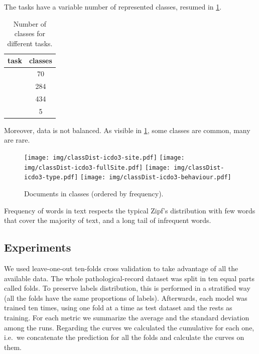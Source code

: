 The tasks have a variable number of represented classes, resumed in
\cref{fig:numClasses}.
\begin{table}
  \center
  \caption{Number of classes for different tasks.}
  \label{fig:numClasses}
  \begin{tabular}{|l|c|}
    \hline
    task & classes \\
    \hline
    \site{} & 70 \\
    \fullSite{} & 284 \\
    \type{} & 434 \\
    \behaviour{} & 5 \\
    \hline
  \end{tabular}
\end{table}
Moreover, data is not balanced. As visible in \cref{fig:classDist},
some classes are common, many are rare.
\begin{figure}
  \centering
  \texttt{[image: img/classDist-icdo3-site.pdf]}
  \texttt{[image: img/classDist-icdo3-fullSite.pdf]}
  \texttt{[image: img/classDist-icdo3-type.pdf]}
  \texttt{[image: img/classDist-icdo3-behaviour.pdf]}
  \caption{Documents in classes (ordered by
    frequency).}
  \label{fig:classDist}
\end{figure}

Frequency of words in text
respects the typical Zipf's distribution with few words that cover the
majority of text, and a long tail of infrequent words.


\subsection{Experiments}
\label{sec:experiments}
We used leave-one-out ten-folds cross validation
to take advantage of all the available data. The whole
pathological-record dataset was split in ten equal parts called
folds. To preserve labels distribution, this is performed in a
stratified way (all the folds have the same proportions of
labels). Afterwards, each
model was trained ten times, using one fold at a time as test
dataset and the rests as training. For each metric we summarize the
average and the standard deviation among the runs. Regarding the
curves we calculated the cumulative for each 
one, i.e.\ we concatenate the prediction for all the folds and
calculate the curves on them. 


